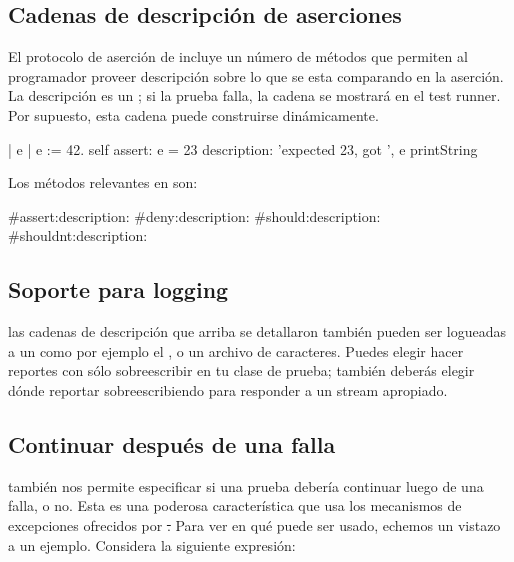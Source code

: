 \documentclass[a4paper,10pt,twoside]{book}
\begin{document}
\subsection{Cadenas de descripci\'on de aserciones}

El protocolo de aserci\'on de  incluye un n\'umero de m\'etodos que permiten
al programador proveer descripci\'on sobre lo que se esta comparando en la aserci\'on. La descripci\'on
es un ; si la prueba falla, la cadena se mostrar\'a en el test runner. Por supuesto, esta cadena
puede construirse din\'amicamente.

\begin{code}{}
| e |
e := 42.
self assert: e = 23
	description: 'expected 23, got ', e printString
\end{code}

Los  m\'etodos relevantes en  son:
\begin{code}{}
#assert:description:
#deny:description:
#should:description:
#shouldnt:description:
\end{code}

\subsection{Soporte para logging}
las cadenas de descripci\'on que arriba se detallaron tambi\'en pueden ser logueadas a un 
 como por ejemplo el , o un archivo de caracteres.
Puedes elegir hacer reportes con s\'olo sobreescribir  en tu clase de prueba; tambi\'en deber\'as elegir d\'onde reportar sobreescribiendo   para
responder a un stream apropiado.

\subsection{Continuar despu\'es de una falla}

\sunit tambi\'en nos permite especificar si una prueba deber\'ia continuar luego de una falla, o no. 
Esta es una poderosa caracter\'istica que usa los mecanismos de excepciones ofrecidos por \st.
Para ver en qu\'e puede ser usado, echemos un vistazo a un ejemplo. Considera la siguiente expresi\'on:
\end{document}
